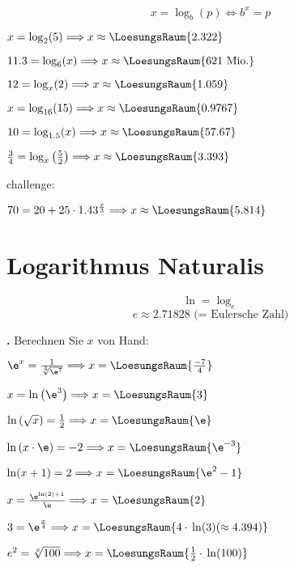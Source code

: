 $$x=\log_b(p) \Longleftrightarrow b^x=p$$

\begin{bbwAufgabenBlock}
\item $x=\log_2(5) \Longrightarrow x \approx    \LoesungsRaum{2.322}$
\item $11.3 = \log_6(x) \Longrightarrow x \approx    \LoesungsRaum{621 \text{ Mio.}}$
\item $12 = \log_x(2) \Longrightarrow x \approx    \LoesungsRaum{1.059}$
\item $x = \log_{16}(15)  \Longrightarrow x \approx    \LoesungsRaum{0.9767}$
\item $10 = \log_{1.5}(x)  \Longrightarrow x \approx    \LoesungsRaum{57.67}$
\item $\frac34 = \log_{x}\left(\frac52\right)  \Longrightarrow x \approx    \LoesungsRaum{3.393}$\\

\noTRAINER{\newpage}

challenge:

\item $70=20 + 25 \cdot{} 1.43^{\frac{x}3}  \Longrightarrow x \approx    \LoesungsRaum{5.814}$

\end{bbwAufgabenBlock}

\newpage

\section{Logarithmus Naturalis}

$$\ln = \log_e$$
$$e\approx 2.71828 \text{ (= Eulersche Zahl)}$$



\textbf{\bbwAufgabenNummer{}.}
Berechnen Sie $x$ von Hand:

\begin{bbwAufgabenBlock}
\item $\e^x = \frac1{\sqrt[4]{\e^7}}  \Longrightarrow x =    \LoesungsRaum{\frac{-7}4}$
\item $x = \ln\left(\e^3\right)  \Longrightarrow x =    \LoesungsRaum{3}$
\item $\ln\left(\sqrt{x}\right)  = \frac12  \Longrightarrow x =    \LoesungsRaum{\e}$
\item $\ln\left(x\cdot{} \e \right)  = -2  \Longrightarrow x =    \LoesungsRaum{\e^{-3}}$
\noTRAINER{\newpage}
\item $\ln(x+1) = 2 \Longrightarrow x =    \LoesungsRaum{\e^2 - 1}$
\item $x=\frac{\e^{\ln(2)+1}}{\e} \Longrightarrow x =    \LoesungsRaum{2}$
\item $3 = \e^{\frac{x}4} \Longrightarrow x=    \LoesungsRaum{4\cdot{} \ln(3) (\approx 4.394)}$
\item $e^2 = \sqrt[x]{100} \Longrightarrow x= \LoesungsRaum{\frac12\cdot{}\ln(100)}$
\end{bbwAufgabenBlock}

